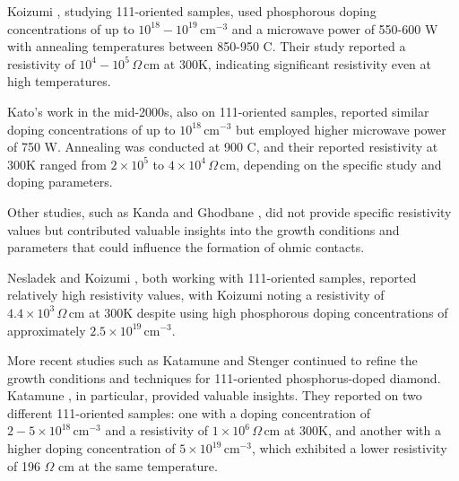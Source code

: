 Koizumi \cite{koizumi2000}, studying 111-oriented samples, used phosphorous doping concentrations of up to \(10^{18} - 10^{19} \, \text{cm}^{-3}\) and a microwave power of 550-600 W with annealing temperatures between 850-950 C. Their study reported a resistivity of \(10^{4} - 10^{5} \, \Omega \, \text{cm}\) at 300K, indicating significant resistivity even at high temperatures.

Kato's work \cite{kato2005} in the mid-2000s, also on 111-oriented samples, reported similar doping concentrations of up to \(10^{18} \, \text{cm}^{-3}\) but employed higher microwave power of 750 W. Annealing was conducted at 900 C, and their reported resistivity at 300K ranged from \(2 \times 10^{5}\) to \(4 \times 10^{4} \, \Omega \, \text{cm}\), depending on the specific study and doping parameters.

Other studies, such as Kanda \cite{kanda2003} and Ghodbane \cite{ghodbane2008}, did not provide specific resistivity values but contributed valuable insights into the growth conditions and parameters that could influence the formation of ohmic contacts.

Nesladek \cite{nesladek2003} and Koizumi \cite{koizumi1997}, both working with 111-oriented samples, reported relatively high resistivity values, with Koizumi \cite{koizumi1997} noting a resistivity of \(4.4 \times 10^{3} \, \Omega \, \text{cm}\) at 300K despite using high phosphorous doping concentrations of approximately \(2.5 \times 10^{19} \, \text{cm}^{-3}\).

More recent studies such as Katamune \cite{katamune2020} and Stenger \cite{stenger2013} continued to refine the growth conditions and techniques for 111-oriented phosphorus-doped diamond. Katamune \cite{katamune2020}, in particular, provided valuable insights. They reported on two different 111-oriented samples: one with a doping concentration of \(2-5 \times 10^{18} \, \text{cm}^{-3}\) and a resistivity of \(1 \times 10^{6} \, \Omega \, \text{cm}\) at 300K, and another with a higher doping concentration of \(5 \times 10^{19} \, \text{cm}^{-3}\), which exhibited a lower resistivity of 196 $\Omega$ cm at the same temperature.

